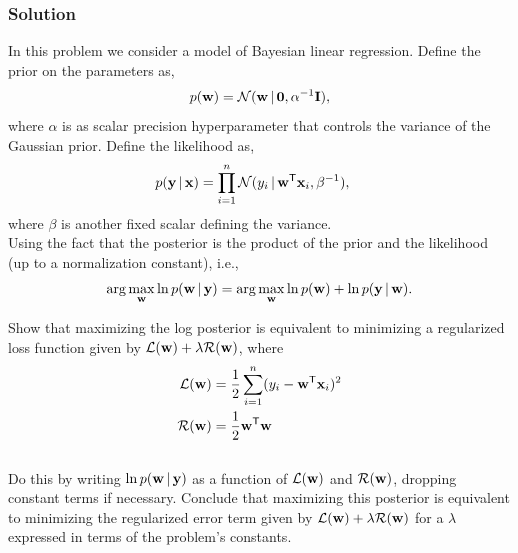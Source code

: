 \documentclass[submit]{harvardml}
\begin{document}
\subsubsection*{Solution}











\newpage
\begin{problem}
In this problem we consider a model of Bayesian linear regression. Define the prior on the parameters as,
\begin{align*}
p(\mathbf{w}) = \mathcal{N}(\mathbf{w} \,|\, \bold0, \alpha^{-1}\mathbf{I} ),
\end{align*}
where $\alpha$ is as scalar precision hyperparameter that controls the variance of the Gaussian prior.  Define the likelihood as,
\begin{align*}
p(\mathbf{y} \,|\, \mathbf{x}) &= \prod_{i=1}^n \mathcal{N}(y_i \,|\, \mathbf{w}^{\mathsf{T}} \mathbf{x}_i, \beta^{-1}),
\end{align*}
where $\beta$ is another fixed scalar defining the variance. \\


\noindent Using the fact that the posterior is the product of the prior and the likelihood (up to a normalization constant), i.e., 
\[\arg\max_{\mathbf{w}} \ln p(\mathbf{w} \,|\, \mathbf{y})= \arg\max_{\mathbf{w}} \ln p(\mathbf{w}) + \ln p(\mathbf{y} \,|\, \mathbf{w}).\]

\noindent Show that maximizing the log posterior is equivalent to minimizing a regularized loss function given by ${\mathcal{L}(\mathbf{w}) + \lambda \mathcal{R}(\mathbf{w})}$, where
\begin{align*}
\mathcal{L}(\mathbf{w}) &= \frac{1}{2}\sum_{i = 1}^n (y_i - \mathbf{w}^{\mathsf{T}} \mathbf{x}_i)^2 \\
\mathcal{R}(\mathbf{w}) &= \frac{1}{2}\mathbf{w}^{\mathsf{T}} \mathbf{w}
\end{align*} \\

\noindent Do this by writing $\ln p(\mathbf{w} \,|\, \mathbf{y})$ as a function of $\mathcal{L}(\mathbf{w})$ and $\mathcal{R}(\mathbf{w})$, dropping constant terms if necessary.  Conclude that maximizing this posterior is equivalent to minimizing the regularized error term given by $\mathcal{L}(\mathbf{w}) + \lambda \mathcal{R}(\mathbf{w})$ for a $\lambda$ expressed in terms of the problem's constants.  
\end{problem}
\end{document}
